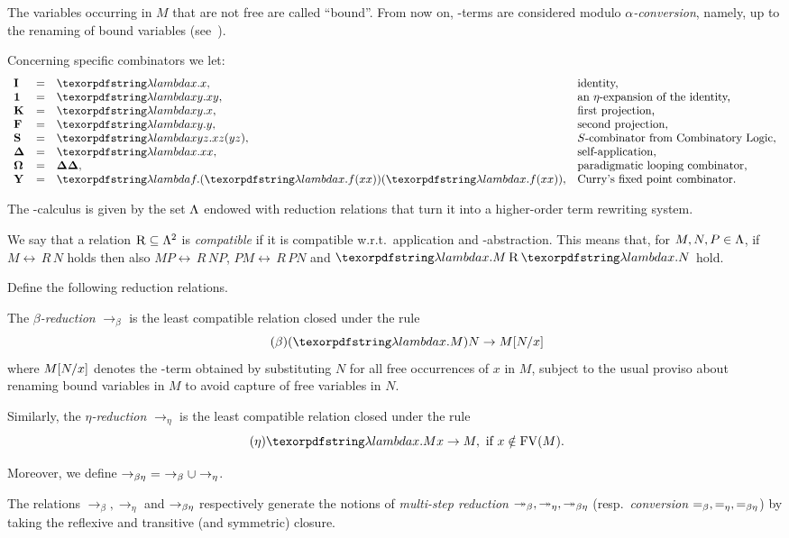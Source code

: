 \noindent
 The variables occurring in $M$ that are not free are called ``bound''.
From now on, \lam-terms are considered modulo \emph{$\alpha$-conversion}, namely, up to the renaming of bound variables (see~\cite[\S2.1]{Bare}).
\begin{nota} Concerning specific combinators we let:
\[
	\begin{array}{lcll}
	\comb{I}&=&\lam x.x,&\textrm{identity,}\\
	\comb{1}&=&\lam xy.xy,&\textrm{an $\eta$-expansion of the identity,}\\
	\comb{K}&=&\lam xy.x,&\textrm{first projection,}\\
	\comb{F}&=&\lam xy.y,&\textrm{second projection,}\\
	\comb{S}&=&\lam xyz.xz(yz),&\textrm{$S$-combinator from Combinatory Logic,}\\
	\comb{\Delta}&=&\lam x.xx,&\textrm{self-application,}\\
	\Om&=&\comb{\Delta\Delta},&\textrm{paradigmatic looping combinator,}\\
	\comb{Y}&=&\lam f.(\lam x.f(xx))(\lam x.f(xx)),&\textrm{Curry's fixed point combinator.}\\
	\end{array}
\]
\end{nota}
The \lam-calculus is given by the set $\Lam$ endowed with reduction relations that turn it into a higher-order term rewriting system.

We say that a relation $\rel{R}\subseteq\Lam^2$ is \emph{compatible} if it is compatible w.r.t.\ application and \lam-abstraction. This means that, for $M,N,P\in\Lam$, if $M \rel{\,R\,} N$ holds then also $MP \rel{\,R\,} NP$, $PM \rel{\,R\,}PN$ and $\lam x.M \rel{\,R\,} \lam x.N$ hold.

\begin{defi} Define the following reduction relations.
\bsub
\item The \emph{$\beta$-reduction} $\to_\beta$ is the least compatible relation closed under the rule
\begin{equation}\tag{$\beta$}
	(\lam x.M)N\to M\subst{x}{N}
\end{equation}
where $M\subst{x}{N}$ denotes the \lam-term obtained by substituting $N$ for all free occurrences of $x$ in $M$, subject to the usual proviso about renaming bound variables in $M$ to avoid capture of free variables in $N$.
\item Similarly, the \emph{$\eta$-reduction} $\to_\eta$ is the least compatible relation closed under the rule
\begin{equation}\tag{$\eta$}
	\lam x.Mx \to M, \textrm{ if }x\notin\FV{M}.
\end{equation}
\item Moreover, we define $\to_\be\ =\ \to_\beta\cup\to_\eta$.
\item
	The relations $\to_\beta,\to_\eta$ and $\to_\be$ respectively generate the notions of \emph{multi-step reduction}  $\msto,\msto[\eta],\msto[\beta\eta]$ (resp.\ \emph{conversion} $=_\beta,=_\eta,=_\be$) by taking the reflexive and transitive (and symmetric) closure.
\esub
\end{defi}

